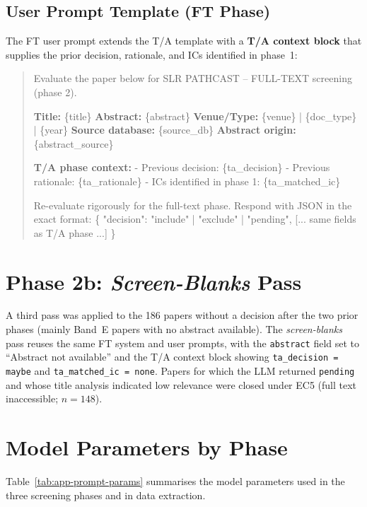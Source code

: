 \subsection*{User Prompt Template (FT Phase)}

The FT user prompt extends the T/A template with a \textbf{T/A context block}
that supplies the prior decision, rationale, and ICs identified in phase~1:

\begin{quote}
\small\ttfamily
Evaluate the paper below for SLR PATHCAST -- FULL-TEXT screening (phase 2).

\textbf{Title:} \{title\}
\textbf{Abstract:} \{abstract\}
\textbf{Venue/Type:} \{venue\} | \{doc\_type\} | \{year\}
\textbf{Source database:} \{source\_db\}
\textbf{Abstract origin:} \{abstract\_source\}

\textbf{T/A phase context:}
  - Previous decision: \{ta\_decision\}
  - Previous rationale: \{ta\_rationale\}
  - ICs identified in phase 1: \{ta\_matched\_ic\}

Re-evaluate rigorously for the full-text phase.
Respond with JSON in the exact format:
\{
  "decision": "include" | "exclude" | "pending",
  [... same fields as T/A phase ...]
\}
\end{quote}

\section{Phase 2b: \textit{Screen-Blanks} Pass}
\label{app:slr-blanks-prompt}

A third pass was applied to the 186 papers without a decision after the two
prior phases (mainly Band~E papers with no abstract available). The
\textit{screen-blanks} pass reuses the same FT system and user prompts, with
the \texttt{abstract} field set to ``Abstract not available'' and the T/A
context block showing \texttt{ta\_decision = maybe} and
\texttt{ta\_matched\_ic = none}. Papers for which the LLM returned
\texttt{pending} and whose title analysis indicated low relevance were closed
under EC5 (full text inaccessible; $n = 148$).

\section{Model Parameters by Phase}
\label{app:slr-prompt-params}

Table~\ref{tab:app-prompt-params} summarises the model parameters used in the
three screening phases and in data extraction.

